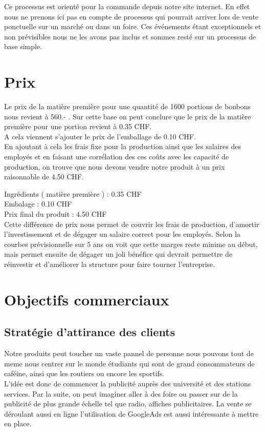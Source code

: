 \documentclass[12pt]{article}
\begin{document}
Ce processus est orienté pour la commande depuis notre site internet. En effet nous ne prenons ici pas en compte de processus qui pourrait arriver lors de vente ponctuelle sur un marché ou dans un foire. Ces événements étant exceptionnels et non prévisibles nous ne les avons pas inclus et sommes resté sur un processus de base simple.

\section{Prix}
Le prix de la matière première pour une quantité de 1600 portions de bonbons nous revient à 560.- . Sur cette base on peut conclure que le prix de la matière première pour une portion revient à 0.35 CHF.\\
A cela viennent s'ajouter le prix de l’emballage de 0.10 CHF.\\

En ajoutant à cela les frais fixe pour la production ainsi que les salaires des employés et en faisant une corrélation des ces coûts avec les capacité de production, on trouve que nous devons vendre notre produit à un prix raisonnable de 4.50 CHF.

Ingrédients ( matière première ) : 0.35 CHF \\
Embalage : 0.10 CHF \\
Prix final du produit :  4.50 CHF\\

Cette différence de prix nous permet de couvrir les frais de production, d'amortir l'investissement et de dégager un salaire correct pour les employés. Selon la courbes prévisionnelle sur 5 ans on voit que cette marges reste minime au début, mais permet ensuite de dégager un joli bénéfice qui devrait permettre de réinvestir et d'améliorer la structure pour faire tourner l'entreprise.

\section{Objectifs commerciaux}
\subsection{Stratégie d'attirance des clients}
Notre produits peut toucher un vaste pannel de personne nous pouvons tout de meme
nous centrer sur le monde étudiants qui sont de grand consommateurs de caféine, ainsi que les routiers ou encore les sportifs.\\
L'idée est donc de commencer la publicité auprès des université et des stations services. Par la suite, on peut imaginer aller à des
foire ou passer sur de la publicité de plus grande échelle tel que radio, affiches publicitaires. La  vente se déroulant aussi en ligne l'utilisation de GoogleAds est aussi intéressante à mettre en place.
\end{document}
